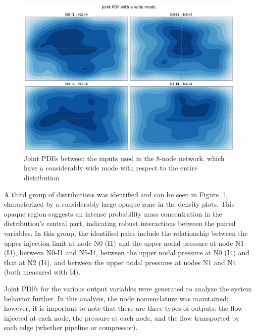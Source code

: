 \begin{figure}
    \begin{center}
        \includegraphics[width=.67\textwidth]{figures/Chapter_NonLinealCensnet/PDF_inputs_inputs_wide_mode.png}
    \end{center}
    \caption{Joint PDFs between the inputs used in the 8-node network, which have a considerably wide mode with respect to the entire distribution }\label{fig:joint_distributions_input_input_wide_mode}
\end{figure}
 

A third group of distributions was identified and can be seen in Figure~\cref{fig:joint_distributions_input_input_wide_mode}, characterized by a considerably large opaque zone in the density plots. This opaque region suggests an intense probability mass concentration in the distribution's central part, indicating robust interactions between the paired variables. In this group, the identified pairs include the relationship between the upper injection limit at node N0 (I1) and the upper nodal pressure at node N1 (I4), between N0-I1 and N5-I4, between the upper nodal pressure at N0 (I4) and that at N2 (I4), and between the upper nodal pressures at nodes N1 and N4 (both measured with I4).


Joint PDFs for the various output variables were generated to analyze the system behavior further. In this analysis, the node nomenclature was maintained; however, it is important to note that there are three types of outputs: the flow injected at each node, the pressure at each node, and the flow transported by each edge (whether pipeline or compressor).


